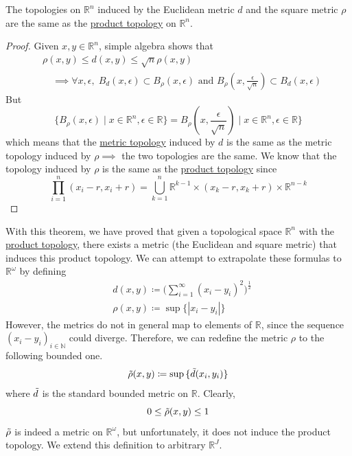  \begin{theorem}
    \label{thm:equivalence-of-the-euclidean-and-square-metrics}
    The topologies on $\mathbb{R}^n$ induced by the Euclidean metric $d$ and the square metric $\rho$ are the same as the \hyperref[def:product-topology]{product topology} on $\mathbb{R}^n$. 
  \end{theorem}
  \begin{proof}
    Given $x, y \in \mathbb{R}^n$, simple algebra shows that 
    \begin{align*}
      & \rho(x, y) \leq d(x, y) \leq \sqrt{n} \rho(x, y) \\
      & \quad \implies \forall x, \epsilon, \; B_d (x, \epsilon) \subset B_\rho (x, \epsilon) \text{ and } B_\rho (x, \frac{\epsilon}{\sqrt{n}}) \subset B_d (x, \epsilon)
    \end{align*}
    But
    \begin{equation}
      \{ B_\rho (x, \epsilon) \mid x \in \mathbb{R}^n, \epsilon \in \mathbb{R}\} = B_\rho (x, \frac{\epsilon}{\sqrt{n}}) \mid x \in \mathbb{R}^n, \epsilon \in \mathbb{R}\}
    \end{equation}
    which means that the \hyperref[def:metric-topology]{metric topology} induced by $d$ is the same as the metric topology induced by $\rho \implies$ the two topologies are the same. We know that the topology induced by $\rho$ is the same as the \hyperref[def:product-topology]{product topology} since 
    \begin{equation}
      \prod_{i=1}^n (x_i - r, x_i + r) = \bigcup_{k=1}^n \mathbb{R}^{k-1} \times (x_k - r, x_k + r) \times \mathbb{R}^{n-k}
    \end{equation}
  \end{proof}

  With this theorem, we have proved that given a topological space $\mathbb{R}^n$ with the \hyperref[def:product-topology]{product topology}, there exists a metric (the Euclidean and square metric) that induces this product topology. We can attempt to extrapolate these formulas to $\mathbb{R}^\omega$ by defining
  \begin{align*}
    & d(x, y) \coloneqq \bigg(\sum_{i=1}^\infty (x_i - y_i)^2 \bigg)^{\frac{1}{2}} \\
    & \rho(x, y) \coloneqq \sup{\{|x_i - y_i|\}}
  \end{align*}
  However, the metrics do not in general map to elements of $\mathbb{R}$, since the sequence $(x_i - y_i)_{i \in \mathbb{N}}$ could diverge. Therefore, we can redefine the metric $\rho$ to the following bounded one. 
  \begin{equation}
    \Tilde{\rho} (x, y) \coloneqq \sup{\{\Tilde{d}(x_i, y_i)\}}
  \end{equation}
  where $\Tilde{d}$ is the standard bounded metric on $\mathbb{R}$. Clearly,
  \begin{equation}
    0 \leq \Tilde{\rho}(x, y) \leq 1
  \end{equation}
  $\Tilde{\rho}$ is indeed a metric on $\mathbb{R}^\omega$, but unfortunately, it does not induce the product topology. We extend this definition to arbitrary $\mathbb{R}^J$. 
  
